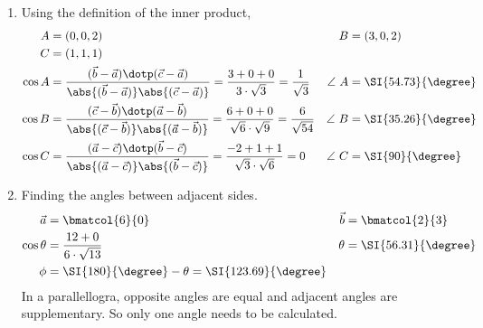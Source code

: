 \begin{enumerate}
    \item Using the definition of the inner product,
          \begin{align}
              A                                                                 &
              = (0, 0, 2)                                                       &
              B                                                                 &
              = (3, 0, 2)                                                         \\
              C                                                                 &
              = (1, 1, 1)                                                         \\
              \cos A                                                            &
              = \frac{(\vec{b} - \vec{a}) \dotp (\vec{c} - \vec{a})}
              {\abs{(\vec{b} - \vec{a})}\abs{(\vec{c} - \vec{a})}}
              = \frac{3 + 0 + 0}{3 \cdot \sqrt{3}} = \frac{1}{\sqrt{3}}         &
              \angle\ A                                                         &
              = \SI{54.73}{\degree}                                               \\
              \cos B                                                            &
              = \frac{(\vec{c} - \vec{b}) \dotp (\vec{a} - \vec{b})}
              {\abs{(\vec{c} - \vec{b})}\abs{(\vec{a} - \vec{b})}}
              = \frac{6 + 0 + 0}{\sqrt{6} \cdot \sqrt{9}} = \frac{6}{\sqrt{54}} &
              \angle\ B                                                         &
              = \SI{35.26}{\degree}                                               \\
              \cos C                                                            &
              = \frac{(\vec{a} - \vec{c}) \dotp (\vec{b} - \vec{c})}
              {\abs{(\vec{a} - \vec{c})}\abs{(\vec{b} - \vec{c})}}
              = \frac{-2 + 1 + 1}{\sqrt{3} \cdot \sqrt{6}} = 0                  &
              \angle\ C                                                         &
              = \SI{90}{\degree}
          \end{align}

    \item Finding the angles between adjacent sides.
          \begin{align}
              \vec{a}     & = \bmatcol{6}{0}                                    &
              \vec{b}     & = \bmatcol{2}{3}                                      \\
              \cos \theta & = \frac{12 + 0}{6 \cdot \sqrt{13}}                  &
              \theta      & = \SI{56.31}{\degree}                                 \\
              \phi        & = \SI{180}{\degree} - \theta = \SI{123.69}{\degree}
          \end{align}
          In a parallellogra, opposite angles are equal and adjacent angles are
          supplementary. So only one angle needs to be calculated.


\end{enumerate}
